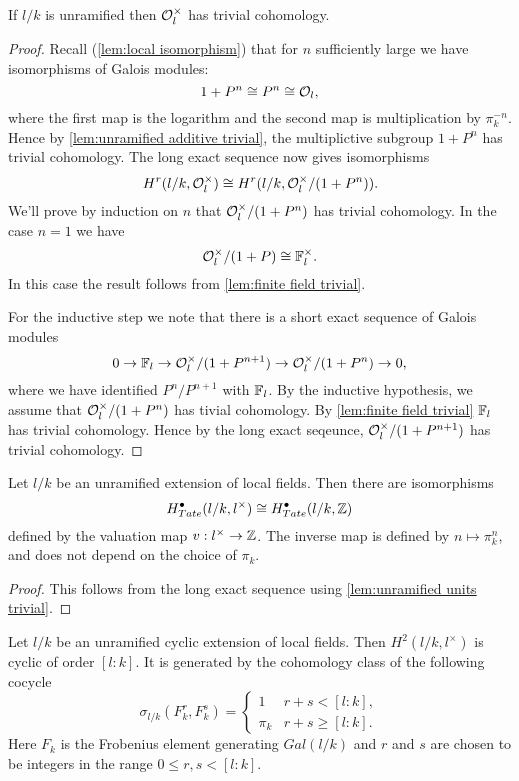 \begin{lemma}	\label{lem:unramified units trivial}
	If $l/k$ is unramified then ${\mathcal O}_l^\times$ has trivial cohomology.
\end{lemma}

\begin{proof}
	Recall (\ref{lem:local isomorphism}) that for $n$ sufficiently large we have isomorphisms of
	Galois modules:
	\[
		1 + P^n \cong P^n \cong {\mathcal O}_l,
	\]
	where the first map is the logarithm and the second map is multiplication by $\pi_k^{-n}$.
	Hence by \ref{lem:unramified additive trivial}, the multiplictive subgroup $1+P^n$ has trivial
	cohomology.
	The long exact sequence now gives isomorphisms
	\[
		H^r(l/k,{\mathcal O}_l^\times) \cong H^r(l/k,{\mathcal O}_l^\times / (1+P^n)).
	\]
	We'll prove by induction on $n$ that ${\mathcal O}_l^\times / (1+P^n)$ has trivial cohomology.
	In the case $n = 1$ we have
	\[
		{\mathcal O}_l^\times / (1+P) \cong {\mathbb F}_l^\times.
	\]
	In this case the result follows from \ref{lem:finite field trivial}.

	For the inductive step we note that there is a short exact sequence of Galois modules
	\[
		0 \to {\mathbb F}_l \to  {\mathcal O}_l^\times / (1+P^{n+1})  \to{\mathcal O}_l^\times / (1+P^n)  \to  0,
	\]
	where we have identified $P^n / P^{n+1}$ with ${\mathbb F}_l$.
	By the inductive hypothesis, we assume that ${\mathcal O}_l^\times / (1+P^n)$ has tivial cohomology.
	By \ref{lem:finite field trivial} ${\mathbb F}_l$ has trivial cohomology.
	Hence by the long exact seqeunce, ${\mathcal O}_l^\times / (1+P^{n+1})$ has trivial cohomology.
\end{proof}


\begin{corollary}
	Let $l/k$ be an unramified extension of local fields.
	Then there are isomorphisms
	\[
		H^\bullet_{Tate}(l/k,l^\times) \cong H^\bullet_{Tate} (l/k,{\mathbb Z})
	\]
	defined by the valuation map $v : l^\times \to {\mathbb Z}$.
	The inverse map is defined by $n \mapsto \pi_k^n$, and does not depend on the choice of $\pi_k$.
\end{corollary}

\begin{proof}
	This follows from the long exact sequence using \ref{lem:unramified units trivial}.
\end{proof}


\begin{lemma} \label{lem:unrammified fundamental class}
	Let $l/k$ be an unramified cyclic extension of local fields.
	Then $H^2(l/k,l^\times)$ is cyclic of order $[l:k]$.
	It is generated by the cohomology class of the following cocycle
	\[
		\sigma_{l/k} (F_k^r, F_k^s) =
		\begin{cases}
			1 & r + s < [l:k], \\
			\pi_k & r + s \ge [l:k].
		\end{cases}
	\]
	Here $F_k$ is the Frobenius element generating $Gal(l/k)$ and $r$ and $s$
	are chosen to be integers in the range $0 \le r,s <[l:k]$.
\end{lemma}

